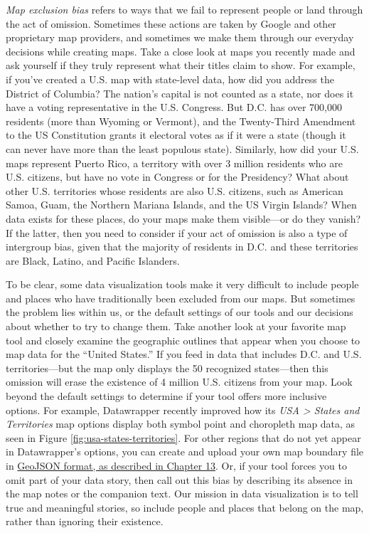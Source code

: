 \documentclass[
  english,
]{book}
\begin{document}
\emph{Map exclusion bias} refers to ways that we fail to represent people or land through the act of omission. Sometimes these actions are taken by Google and other proprietary map providers, and sometimes we make them through our everyday decisions while creating maps. Take a close look at maps you recently made and ask yourself if they truly represent what their titles claim to show. For example, if you've created a U.S. map with state-level data, how did you address the District of Columbia? The nation's capital is not counted as a state, nor does it have a voting representative in the U.S. Congress. But D.C. has over 700,000 residents (more than Wyoming or Vermont), and the Twenty-Third Amendment to the US Constitution grants it electoral votes as if it were a state (though it can never have more than the least populous state). Similarly, how did your U.S. maps represent Puerto Rico, a territory with over 3 million residents who are U.S. citizens, but have no vote in Congress or for the Presidency? What about other U.S. territories whose residents are also U.S. citizens, such as American Samoa, Guam, the Northern Mariana Islands, and the US Virgin Islands? When data exists for these places, do your maps make them visible---or do they vanish? If the latter, then you need to consider if your act of omission is also a type of intergroup bias, given that the majority of residents in D.C. and these territories are Black, Latino, and Pacific Islanders.

To be clear, some data visualization tools make it very difficult to include people and places who have traditionally been excluded from our maps. But sometimes the problem lies within us, or the default settings of our tools and our decisions about whether to try to change them. Take another look at your favorite map tool and closely examine the geographic outlines that appear when you choose to map data for the ``United States.'' If you feed in data that includes D.C. and U.S. territories---but the map only displays the 50 recognized states---then this omission will erase the existence of 4 million U.S. citizens from your map. Look beyond the default settings to determine if your tool offers more inclusive options. For example, Datawrapper recently improved how its \emph{USA \textgreater{} States and Territories} map options display both symbol point and choropleth map data, as seen in Figure \ref{fig:usa-states-territories}. For other regions that do not yet appear in Datawrapper's options, you can create and upload your own map boundary file in \href{geojson.html}{GeoJSON format, as described in Chapter 13}. Or, if your tool forces you to omit part of your data story, then call out this bias by describing its absence in the map notes or the companion text. Our mission in data visualization is to tell true and meaningful stories, so include people and places that belong on the map, rather than ignoring their existence.
\end{document}
